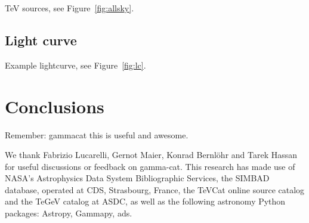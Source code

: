 \documentclass[11pt,twoside]{article}
\begin{document}
TeV sources, see Figure~\ref{fig:allsky}.



\subsection{Light curve}

Example lightcurve, see Figure~\ref{fig:lc}.


\section{Conclusions}

Remember: gammacat this is useful and awesome.

\clearpage %

\acknowledgements We thank Fabrizio Lucarelli, Gernot Maier, Konrad Bernl\"ohr and Tarek Hassan for useful discussions or feedback on gamma-cat.
This research has made use of NASA's Astrophysics Data System Bibliographic Services, the SIMBAD database, operated at CDS, Strasbourg, France, the TeVCat online source catalog and the TeGeV catalog at ASDC, as well as the following astronomy Python packages: Astropy, Gammapy, ads.


\end{document}
